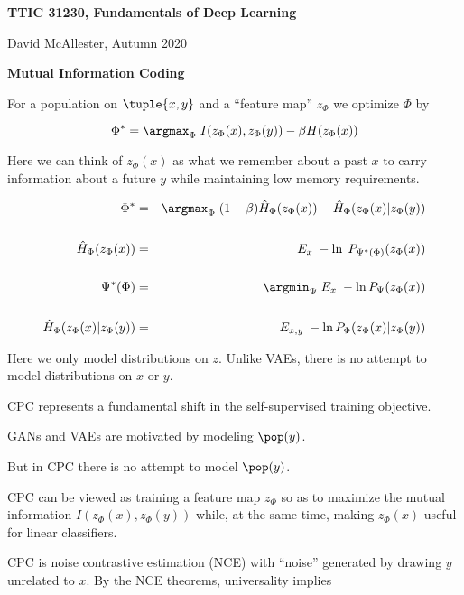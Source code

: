 





{\Huge
  \centerline{\bf TTIC 31230,  Fundamentals of Deep Learning}
  \vfill
  \centerline{David McAllester, Autumn   2020}
  \vfill
  \centerline{\bf Mutual Information Coding}
  \vfill
  \vfill



For a population on $\tuple{x,y}$ and a ``feature map'' $z_\Phi$ we optimize $\Phi$ by

\vfill
$$\Phi^* = \argmax_\Phi \; I(z_\Phi(x),z_\Phi(y)) - \beta H(z_\Phi(x))$$


\vfill
Here we can think of $z_\Phi(x)$ as what we remember about a past $x$ to carry information about a future $y$ while maintaining low memory requirements.


\begin{eqnarray*}
\Phi^* & = & \argmax_\Phi \; (1-\beta)\hat{H}_\Phi(z_\Phi(x)) - \hat{H}_\Phi(z_\Phi(x)|z_\Phi(y)) \\
\\
\hat{H}_\Phi(z_\Phi(x)) & = & E_x \; -\ln \;P_{\Psi^*(\Phi)}(z_\Phi(x)) \\
\\
\Psi^*(\Phi) & = & \argmin_\Psi\;E_x\;-\ln P_\Psi(z_\Phi(x)) \\
\\
\hat{H}_\Phi(z_\Phi(x)|z_\Phi(y)) & = & E_{x,y} \; -\ln P_\Phi(z_\Phi(x)|z_\Phi(y)) 
\end{eqnarray*}

\vfill
Here we only model distributions on $z$.  Unlike VAEs, there is no attempt to model distributions on $x$ or $y$.


CPC represents a fundamental shift in the self-supervised training objective.

\vfill
GANs and VAEs are motivated by modeling $\pop(y)$.

\vfill
But in CPC there is no attempt to model $\pop(y)$.

\vfill
CPC can be viewed as training a feature map $z_\Phi$ so as to maximize the mutual information {\color{red} $I(z_\Phi(x),z_\Phi(y))$} while, at the same time, making $z_\Phi(x)$ useful
for linear classifiers.


CPC is noise contrastive estimation (NCE) with ``noise'' generated by drawing $y$ unrelated to $x$.
By the NCE theorems, universality implies

}
